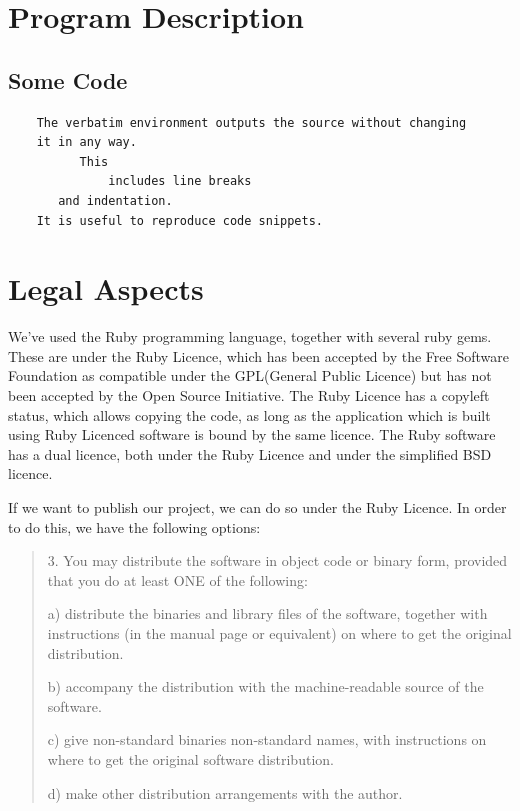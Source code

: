 \documentclass[a4wide, 11pt]{article}
\begin{document}
\clearpage

\section{Program Description}
\subsection{Some Code} 

\begin{verbatim}
    The verbatim environment outputs the source without changing
    it in any way. 
          This
              includes line breaks
       and indentation. 
    It is useful to reproduce code snippets.
\end{verbatim}
\clearpage

\section{Legal Aspects}

We've used the Ruby programming language, together with several ruby gems.
These are under the Ruby Licence, which has been accepted by the Free Software
Foundation as compatible under the GPL(General Public Licence)\cite{GNUlicence}
but has not been accepted by the Open Source Initiative. The Ruby Licence has a
copyleft status, which allows copying the code, as long as the application
which is built using Ruby Licenced software is bound by the same licence. The
Ruby software has a dual licence, both under the Ruby Licence and under the
simplified BSD licence.

If we want to publish our project, we can do so under the Ruby Licence.
In order to do this, we have the following options:

\begin{quote}
3. You may distribute the software in object code or binary form,
   provided that you do at least ONE of the following:

a) distribute the binaries and library files of the software,
together with instructions (in the manual page or equivalent)
on where to get the original distribution.

b) accompany the distribution with the machine-readable source of
the software.

c) give non-standard binaries non-standard names, with
instructions on where to get the original software distribution.

d) make other distribution arrangements with the author.
     \cite{Rubylicence}
\end{quote}
\end{document}
